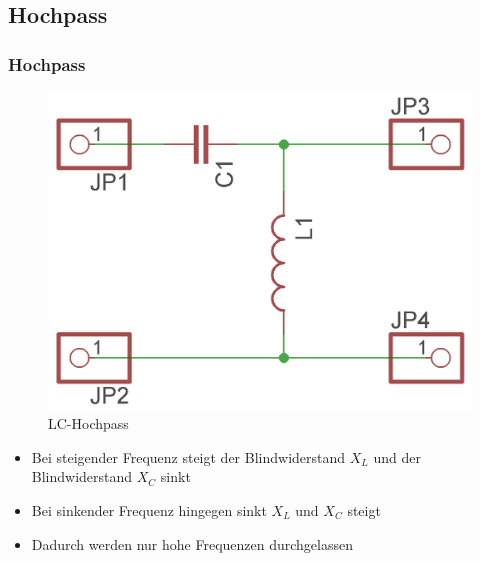 \subsection*{Hochpass}
\begin{frame}
  \frametitle{Hochpass}
  \begin{center}
    \begin{figure}
      \includegraphics[width=\textwidth,height=.45\textheight,keepaspectratio]{e07/LC-Hochpass.png}
      \caption{LC-Hochpass}
    \end{figure}
  \end{center}
  \begin{itemize}
    \item Bei steigender Frequenz steigt der Blindwiderstand $X_L$ und der Blindwiderstand $X_C$ sinkt
    \item Bei sinkender Frequenz hingegen sinkt $X_L$ und $X_C$ steigt
    \item Dadurch werden nur hohe Frequenzen durchgelassen
  \end{itemize}
\end{frame}

